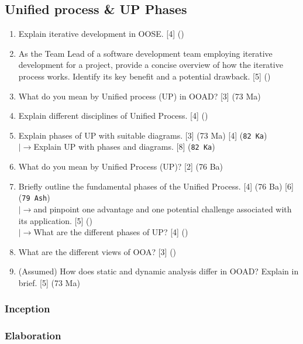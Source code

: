 \documentclass[12pt]{article}
\newcommand{\lb}{\\$\left|\rightarrow\right.$}
\begin{document}
  \subsection{Unified process \& UP Phases}
    \begin{enumerate}
      \item Explain iterative development in OOSE. \hfill [4] ()

      \item As the Team Lead of a software development team employing iterative development for a project, provide a concise overview of how the iterative process works. Identify its key benefit and a potential drawback. \hfill [5] ()

      \item What do you mean by Unified process (UP) in OOAD? \hfill [3] (73 Ma)

      \item Explain different disciplines of Unified Process. \hfill [4] ()

      \item Explain phases of UP with suitable diagrams. \hfill [3] (73 Ma) [4] (\texttt{82 Ka})
        \lb Explain UP with phases and diagrams. \hfill [8] (\texttt{82 Ka})

      \item What do you mean by Unified Process (UP)?  \hfill [2] (76 Ba)

      \item Briefly outline the fundamental phases of the Unified Process. \hfill [4] (76 Ba) [6] (\texttt{79 Ash})
        \lb and pinpoint one advantage and one potential challenge associated with its application. \hfill [5] ()
        \lb What are the different phases of UP? \hfill [4] ()

      \item What are the different views of OOA? \hfill [3] ()

      \item (Assumed) How does static and dynamic analysis differ in OOAD? Explain in brief. \hfill [5] (73 Ma)
    \end{enumerate}

    \subsubsection{Inception}
    \subsubsection{Elaboration}
\end{document}
